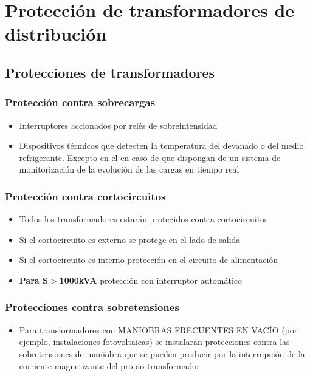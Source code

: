 \chapter{Protección de transformadores de distribución}
\section{Protecciones de transformadores}
\subsection{Protección contra sobrecargas}
\begin{itemize}
	\item Interruptores accionados por relés de sobreintensidad
	\item Dispositivos térmicos que detecten la temperatura del devanado o del medio
	refrigerante.	Excepto en el en caso de que dispongan de un sistema de monitorización
	de la evolución de las cargas en tiempo real
\end{itemize}
\subsection{Protección contra cortocircuitos}
\begin{itemize}
	\item Todos los transformadores estarán protegidos contra cortocircuitos
	\item Si el cortocircuito es externo se protege en el lado de salida
	\item Si el cortocircuito es interno protección en el circuito de alimentación
	\item \textbf{Para S$>$1000kVA} protección con interruptor automático
\end{itemize}
\subsection{Protecciones contra sobretensiones}
\begin{itemize}
	\item Para transformadores con MANIOBRAS FRECUENTES EN VACÍO (por ejemplo,
	instalaciones fotovoltaicas) se instalarán protecciones contra las sobretensiones
	de maniobra que se pueden producir por la interrupción de la corriente
	magnetizante del propio transformador
\end{itemize}
